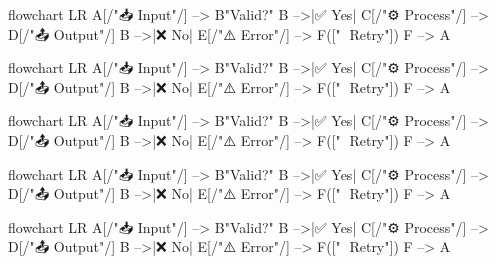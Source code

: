 \documentclass[12pt, a4paper]{article}
\begin{document}

\begin{mermaid}[
    type    = flowchart,
    theme   = ocean,
    caption = {Theme \texttt{ocean} — dark navy with electric-blue accents},
    label   = {fig:theme-ocean},
    width   = 0.80\linewidth
]
flowchart LR
    A[/"📥 Input"/] --> B{"Valid?"}
    B -->|✅ Yes| C[/"⚙️ Process"/] --> D[/"📤 Output"/]
    B -->|❌ No|  E[/"⚠️ Error"/]  --> F(["🔄 Retry"])
    F --> A
\end{mermaid}

\begin{mermaid}[
    type    = flowchart,
    theme   = forest,
    caption = {Theme \texttt{forest} — deep green, natural palette},
    label   = {fig:theme-forest},
    width   = 0.80\linewidth
]
flowchart LR
    A[/"📥 Input"/] --> B{"Valid?"}
    B -->|✅ Yes| C[/"⚙️ Process"/] --> D[/"📤 Output"/]
    B -->|❌ No|  E[/"⚠️ Error"/]  --> F(["🔄 Retry"])
    F --> A
\end{mermaid}

\begin{mermaid}[
    type    = flowchart,
    theme   = sunset,
    caption = {Theme \texttt{sunset} — warm charcoal with amber highlights},
    label   = {fig:theme-sunset},
    width   = 0.80\linewidth
]
flowchart LR
    A[/"📥 Input"/] --> B{"Valid?"}
    B -->|✅ Yes| C[/"⚙️ Process"/] --> D[/"📤 Output"/]
    B -->|❌ No|  E[/"⚠️ Error"/]  --> F(["🔄 Retry"])
    F --> A
\end{mermaid}

\begin{mermaid}[
    type    = flowchart,
    theme   = arctic,
    caption = {Theme \texttt{arctic} — clean white with slate-blue accents},
    label   = {fig:theme-arctic},
    width   = 0.80\linewidth
]
flowchart LR
    A[/"📥 Input"/] --> B{"Valid?"}
    B -->|✅ Yes| C[/"⚙️ Process"/] --> D[/"📤 Output"/]
    B -->|❌ No|  E[/"⚠️ Error"/]  --> F(["🔄 Retry"])
    F --> A
\end{mermaid}

\begin{mermaid}[
    type    = flowchart,
    theme   = midnight,
    caption = {Theme \texttt{midnight} — near-black with violet accents},
    label   = {fig:theme-midnight},
    width   = 0.80\linewidth
]
flowchart LR
    A[/"📥 Input"/] --> B{"Valid?"}
    B -->|✅ Yes| C[/"⚙️ Process"/] --> D[/"📤 Output"/]
    B -->|❌ No|  E[/"⚠️ Error"/]  --> F(["🔄 Retry"])
    F --> A
\end{mermaid}
\end{document}

